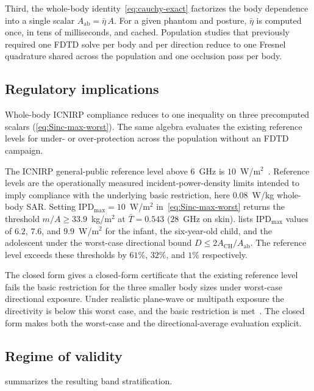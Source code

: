 \documentclass[journal,twocolumn,10pt]{IEEEtran}
\theoremstyle{plain}
\newcommand{\IPD}{\mathrm{IPD}}
\newcommand{\Aab}{A_{\mathrm{ab}}}
\newcommand{\Tbar}{\bar{T}}
\begin{document}
Third, the whole-body identity~\eqref{eq:cauchy-exact} factorizes the
body dependence into a single scalar $\Aab = \bar\eta\,A$. For a
given phantom and posture, $\bar\eta$ is computed once, in tens of
milliseconds, and cached. Population studies that previously
required one FDTD solve per body and per direction reduce to one
Fresnel quadrature shared across the population and one occlusion
pass per body.

\subsection{Regulatory implications}\label{subsec:disc-regulatory}

Whole-body ICNIRP compliance reduces to one inequality on three
precomputed scalars (\cref{eq:Sinc-max-worst}). The same algebra
evaluates the existing reference levels for under- or over-protection
across the population without an FDTD campaign.

The ICNIRP general-public reference level above $6$~GHz is
$10$~W/m$^2$~\cite{ICNIRP2020}. Reference levels are the
operationally measured incident-power-density limits intended to
imply compliance with the underlying basic restriction, here
$0.08$~W/kg whole-body SAR. Setting $\IPD_{\mathrm{max}} =
10$~W/m$^2$ in~\eqref{eq:Sinc-max-worst} returns the threshold
$m/A \geq 33.9$~kg/m$^2$ at $\Tbar = 0.543$ ($28$~GHz on skin).
 lists $\IPD_{\mathrm{max}}$ values of $6.2$,
$7.6$, and $9.9$~W/m$^2$ for the infant, the six-year-old child, and
the adolescent under the worst-case directional bound
$D \le 2A_{\mathrm{CH}}/\Aab$. The reference level exceeds these
thresholds by $61\%$, $32\%$, and $1\%$ respectively.

The closed form gives a closed-form certificate that the existing
reference level fails the basic restriction for the three smaller
body sizes under worst-case directional exposure. Under realistic
plane-wave or multipath exposure the directivity is below this
worst case, and the basic restriction is met~\cite{ICNIRP2020}. The
closed form makes both the worst-case and the directional-average
evaluation explicit.

\subsection{Regime of validity}\label{subsec:disc-validity}

 summarizes the resulting band stratification.
\end{document}
